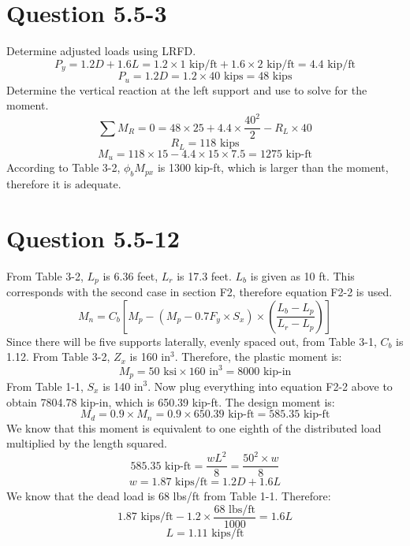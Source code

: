 \documentclass{article}
\begin{document}
\section*{Question 5.5-3}
Determine adjusted loads using LRFD.
\[P_y = 1.2D+1.6L=1.2\times 1\text{ kip/ft}+1.6\times 2\text{ kip/ft}=4.4\text{ kip/ft}\]
\[P_u = 1.2D=1.2\times 40\text{ kips}=48\text{ kips}\]
Determine the vertical reaction at the left support and use to solve for the moment.
\[\sum M_R=0=48\times25+4.4\times \frac{40^2}{2}- R_L\times 40\]
\[R_L=118 \text{ kips}\] 
\[M_u=118\times 15-4.4\times 15\times 7.5=1275\text{ kip-ft}\]
According to Table 3-2, $\phi_bM_{px}$ is 1300 kip-ft, which is larger than the moment, therefore it is $\boxed{\text{adequate}}$.
\section*{Question 5.5-12} 
From Table 3-2, $L_p$ is 6.36 feet, $L_r$ is 17.3 feet. $L_b$ is given as 10 ft. This corresponds with the second case in section F2, therefore equation F2-2 is used. 
\[M_n=C_b\left[M_p-(M_p-0.7F_y\times S_x)\times\left(\frac{L_b-L_p}{L_r-L_p}\right)\right]\]
Since there will be five supports laterally, evenly spaced out, from Table 3-1, $C_b$ is 1.12. From Table 3-2, $Z_x$ is 160 $\text{in}^3$. Therefore, the plastic moment is: 
\[M_p=50\text{ ksi}\times 160 \text{ in}^3=8000\text{ kip-in}\]
From Table 1-1, $S_x$ is 140 $\text{in}^3$. Now plug everything into equation F2-2 above to obtain 7804.78 kip-in, which is 650.39 kip-ft. The design moment is:
\[M_d=0.9\times M_n=0.9\times 650.39\text{ kip-ft}=585.35\text{ kip-ft}\]
We know that this moment is equivalent to one eighth of the distributed load multiplied by the length squared. 
\[585.35\text{ kip-ft}=\frac{wL^2}{8}=\frac{50^2\times w}{8}\] 
\[w=1.87\text{ kips/ft}=1.2D+1.6L\]
We know that the dead load is 68 lbs/ft from Table 1-1. Therefore: 
\[1.87\text{ kips/ft}-1.2\times \frac{68\text{ lbs/ft}}{1000}=1.6L\] 
\[L=\boxed{1.11\text{ kips/ft}}\]
\newpage
\end{document}
